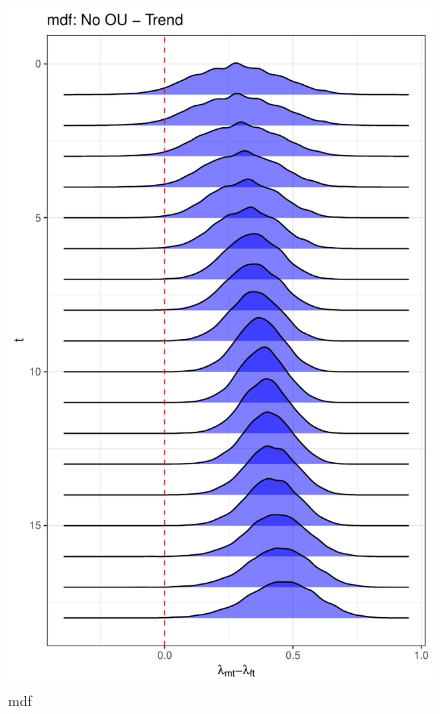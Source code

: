 \documentclass[
  12pt,
]{article}
\begin{document}
\begin{figure}

{\centering \includegraphics[width=0.9\linewidth]{../Figures/mdf/lambda_diff} 

}

\caption{mdf}\label{fig:unnamed-chunk-17}
\end{figure}
\end{document}
